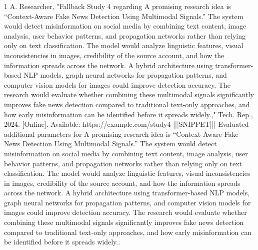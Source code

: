 \documentclass[conference]{IEEEtran}
\begin{document}
\begin{thebibliography}{1}
A. Researcher, "Fallback Study 4 regarding A promising research idea is “Context-Aware Fake News Detection Using Multimodal Signals.” The system would detect misinformation on social media by combining text content, image analysis, user behavior patterns, and propagation networks rather than relying only on text classification. The model would analyze linguistic features, visual inconsistencies in images, credibility of the source account, and how the information spreads across the network. A hybrid architecture using transformer-based NLP models, graph neural networks for propagation patterns, and computer vision models for images could improve detection accuracy. The research would evaluate whether combining these multimodal signals significantly improves fake news detection compared to traditional text-only approaches, and how early misinformation can be identified before it spreads widely.," Tech. Rep., 2024. [Online]. Available: https://example.com/study4 |||SNIPPET||| Evaluated additional parameters for A promising research idea is “Context-Aware Fake News Detection Using Multimodal Signals.” The system would detect misinformation on social media by combining text content, image analysis, user behavior patterns, and propagation networks rather than relying only on text classification. The model would analyze linguistic features, visual inconsistencies in images, credibility of the source account, and how the information spreads across the network. A hybrid architecture using transformer-based NLP models, graph neural networks for propagation patterns, and computer vision models for images could improve detection accuracy. The research would evaluate whether combining these multimodal signals significantly improves fake news detection compared to traditional text-only approaches, and how early misinformation can be identified before it spreads widely..

\end{thebibliography}
\end{document}
